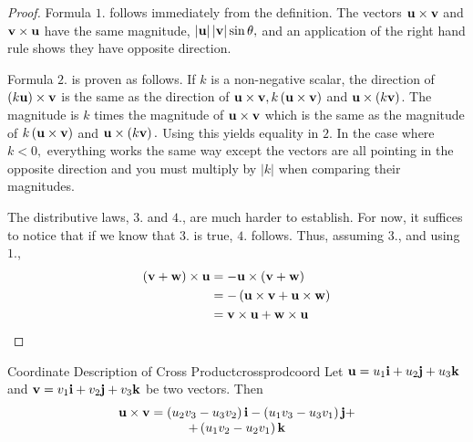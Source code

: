 \begin{proof}
Formula $1.$ follows immediately from the definition. The vectors 
${\bf u}\times {\bf v}$ and ${\bf v}\times {\bf u}$ have the same magnitude, 
$\left\vert {\bf u}\right\vert \left\vert {\bf v}\right\vert \sin
\theta ,$ and an application of the right hand rule shows they have opposite
direction. 

Formula $2.$ is proven as follows. If $k $ is a
non-negative scalar, the direction of $\left( k {\bf u}\right)
\times {\bf v}$ is the same as the direction of ${\bf u}\times {\bf v},
k \left( {\bf u}\times {\bf v}\right) $ and ${\bf u}\times \left(
k {\bf v}\right) $. The magnitude is  $k$ times the
magnitude of ${\bf u}\times {\bf v}$ which is the same as the magnitude of 
$k \left( {\bf u}\times {\bf v}\right) $ and ${\bf u}\times \left(
k {\bf v}\right) .$ Using this yields equality in $2$. In
the case where $k <0,$ everything works the same way except the vectors
are all pointing in the opposite direction and you must multiply by 
$\left\vert k \right\vert $ when comparing their magnitudes. 

The distributive laws, $3.$ and $4.$, are much harder to establish. For now, it suffices to
 notice that if we know that $3.$ is true, $4.$ follows. Thus, assuming $3.$, and using $1.$,
\begin{align*}
\left( {\bf v}+{\bf w}\right) \times {\bf u}& =-{\bf u}\times \left(
{\bf v}+{\bf w}\right) \\
& =-\left( {\bf u}\times {\bf v}+{\bf u}\times {\bf w}\right) \\
& ={\bf v}\times {\bf u}+{\bf w}\times {\bf u}
\end{align*}
\end{proof}

\begin{proposition}{Coordinate Description of Cross Product}{crossprodcoord}
 Let ${\bf u}=u_{1}{\bf i}+u_{2}{\bf j}+u_{3}{\bf k}$
 and ${\bf v}=v_{1}{\bf i}+v_{2}{\bf j}+v_{3}{\bf k}$ be two
vectors. Then
\begin{equation}
\begin{array}{c}
{\bf u}\times {\bf v} 
 =\left( u_{2}v_{3}-u_{3}v_{2}\right) {\bf i}-\left(
u_{1}v_{3} - u_{3}v_{1}\right) {\bf j}+  \\
 +\left( u_{1}v_{2}-u_{2}v_{1}\right) {\bf k}  \label{crossprod1}
\end{array}
\end{equation}
\end{proposition}

